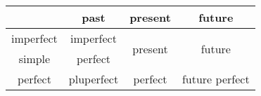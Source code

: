 \begin{tabular}{@{}cccc@{}}
    \toprule
              & past       & present                  & future                  \\ \midrule
    imperfect & imperfect  & \multirow{2}{*}{present} & \multirow{2}{*}{future} \\
    simple    & perfect    &                          &                         \\
    perfect   & pluperfect & perfect                  & future perfect          \\ \bottomrule
\end{tabular}